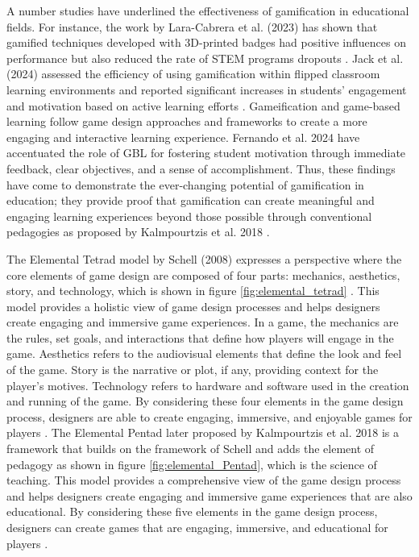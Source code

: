 A number studies have underlined the effectiveness of gamification in educational fields. For instance, the work by Lara-Cabrera et al. (2023) has shown that gamified techniques developed with 3D-printed badges had positive influences on performance but also reduced the rate of STEM programs dropouts \cite{lara2023badges}. Jack et al. (2024) assessed the efficiency of using gamification within flipped classroom learning environments and reported significant increases in students' engagement and motivation based on active learning efforts \cite{jack2024gamification}. Gameification and game-based learning follow game design approaches and frameworks to create a more engaging and interactive learning experience. Fernando et al. 2024 have accentuated the role of GBL for fostering student motivation through immediate feedback, clear objectives, and a sense of accomplishment. Thus, these findings have come to demonstrate the ever-changing potential of gamification in education; they provide proof that gamification can create meaningful and engaging learning experiences beyond those possible through conventional pedagogies as proposed by Kalmpourtzis et al. 2018 \cite{Kalmpourtzis2018}.

The Elemental Tetrad model by Schell (2008) expresses a perspective where the core elements of game design are composed of four parts: mechanics, aesthetics, story, and technology, which is shown in figure \ref{fig:elemental_tetrad} . This model provides a holistic view of game design processes and helps designers create engaging and immersive game experiences. In a game, the mechanics are the rules, set goals, and interactions that define how players will engage in the game. Aesthetics refers to the audiovisual elements that define the look and feel of the game. Story is the narrative or plot, if any, providing context for the player's motives. Technology refers to hardware and software used in the creation and running of the game. By considering these four elements in the game design process, designers are able to create engaging, immersive, and enjoyable games for players \cite{schell2008art}. The Elemental Pentad later proposed by Kalmpourtzis et al. 2018 is a framework that builds on the framework of Schell and adds the element of pedagogy as shown in figure \ref{fig:elemental_Pentad}, which is the science of teaching. This model provides a comprehensive view of the game design process and helps designers create engaging and immersive game experiences that are also educational. By considering these five elements in the game design process, designers can create games that are engaging, immersive, and educational for players \cite{Kalmpourtzis2018}.

